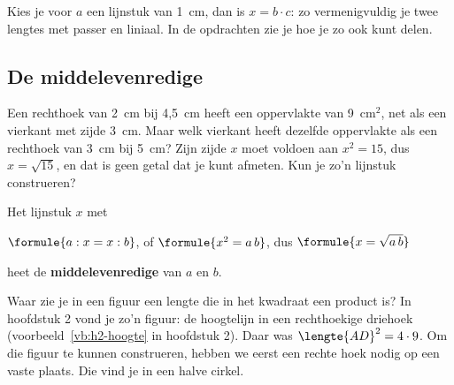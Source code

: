 Kies je voor $a$ een lijnstuk van 1~cm, dan is $x = b \cdot c$: zo vermenigvuldig je twee lengtes met passer en liniaal. In de opdrachten zie je hoe je zo ook kunt delen.


\begin{oefeningen}
\end{oefeningen}

\subsection{De middelevenredige}

Een rechthoek van 2~cm bij 4,5~cm heeft een oppervlakte van 9~cm$^2$, net als een vierkant met zijde 3~cm. Maar welk vierkant heeft dezelfde oppervlakte als een rechthoek van 3~cm bij 5~cm? Zijn zijde $x$ moet voldoen aan $x^2 = 15$, dus $x = \sqrt{15}$, en dat is geen getal dat je kunt afmeten. Kun je zo'n lijnstuk construeren?

\begin{theorie}
Het lijnstuk $x$ met

\vspace{1mm}
\qquad $\formule{a : x = x : b}$, \quad of \quad $\formule{x^2 = a\,b}$, \quad dus \quad $\formule{x = \sqrt{a\,b}}$

\vspace{1mm}
heet de \textbf{\textcolor{accent}{middelevenredige}} van $a$ en $b$.
\end{theorie}

Waar zie je in een figuur een lengte die in het kwadraat een product is? In hoofdstuk 2 vond je zo'n figuur: de hoogtelijn in een rechthoekige driehoek (voorbeeld~\ref{vb:h2-hoogte} in hoofdstuk 2). Daar was ${\lengte{AD}^2 = 4 \cdot 9}$. Om die figuur te kunnen construeren, hebben we eerst een rechte hoek nodig op een vaste plaats. Die vind je in een halve cirkel.

